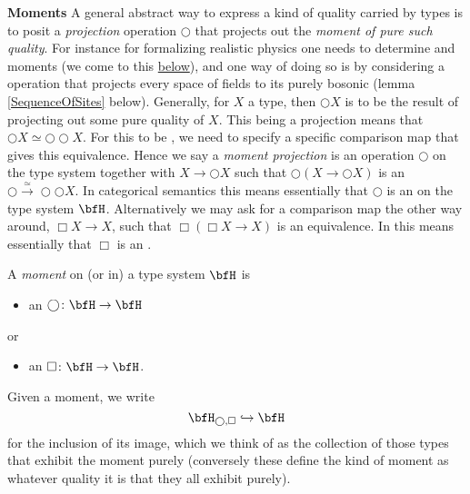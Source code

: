 \textbf{Moments}
A general abstract way to express a kind of quality carried by types is to posit a \emph{projection} operation $\bigcirc$ that projects out the \emph{moment of pure such quality}.
For instance for formalizing realistic physics one needs to determine  and  moments (we come to this \hyperlink{Externalization}{below}), and one way of doing so is by considering a  operation that projects every space of fields to its purely bosonic  (lemma \ref{SequenceOfSites} below).
Generally, for $X$ a type, then $\bigcirc X$ is to be the result of projecting out some pure quality of $X$. This being a projection means that $\bigcirc X  \simeq \bigcirc \bigcirc X$. For this to be , we need to specify a specific comparison map that gives this equivalence. Hence we say a \emph{moment projection} is an operation $\bigcirc$ on the type system together with  $X \to \bigcirc X$ such that $\bigcirc(X \to \bigcirc X)$ is an  $\bigcirc \stackrel{\simeq}{\longrightarrow} \bigcirc \bigcirc X$.
In categorical semantics this means essentially that $\bigcirc$ is an  on the type system $\bfH$.
Alternatively we may ask for a comparison map the other way around, $\Box X \longrightarrow X$, such that $\Box(\Box X \longrightarrow X)$ is an equivalence. In  this means essentially that $\Box$ is an .
\begin{defn}
\label{Moments}\hypertarget{Moments}{}
A \emph{moment} on (or in) a type system $\bfH$ is
\begin{itemize}%
\item an  $\bigcirc \colon \bfH \to \bfH$
\end{itemize}
or
\begin{itemize}%
\item an  $\Box \colon \bfH \to \bfH$.
\end{itemize}
Given a moment, we write
\begin{displaymath}
\bfH_{\bigcirc, \Box} \hookrightarrow \bfH
\end{displaymath}
for the inclusion of its image, which we think of as the collection of those types that exhibit the moment purely (conversely these define the kind of moment as whatever quality it is that they all exhibit purely).
\end{defn}
